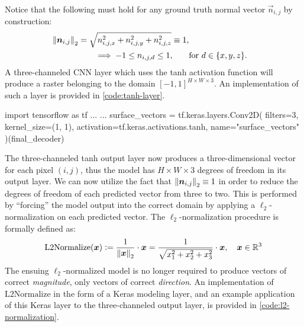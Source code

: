 Notice that the following must hold for any ground truth normal vector $\vec{n}_{i,j}$ by construction:
\begin{align*}
  \left\lVert\boldsymbol{n}_{i,j}\right\rVert_2 = \sqrt{n_{i,j,x}^2 + n_{i,j,y}^2 + n_{i,j,z}^2} \equiv 1, \\
  \implies -1 \leq n_{i,j,d} \leq 1, \qquad &\text{for } d \in \{x, y, z\}.
\end{align*}
%
A three-channeled CNN layer which uses the tanh activation function will produce a raster belonging to the domain $\left[-1, 1\right]^{H \times W \times 3}$.
An implementation of such a layer is provided in \cref{code:tanh-layer}.
\begin{listing}[H]
  \label{code:tanh-layer}
  \begin{pythoncode}
  import tensorflow as tf
  ...
  ...
  surface_vectors = tf.keras.layers.Conv2D(
      filters=3,
      kernel_size=(1, 1),
      activation=tf.keras.activations.tanh,
      name="surface_vectors"
  )(final_decoder)
  \end{pythoncode}
\end{listing}
\noindent
The three-channeled tanh output layer now produces a three-dimensional vector for each pixel $(i,j)$, thus the model has $H \times W \times 3$ degrees of freedom in its output layer.
We can now utilize the fact that $\left\lVert\boldsymbol{n}_{i,j}\right\rVert_2 \equiv 1$ in order to reduce the degrees of freedom of each predicted vector from three to two.
This is performed by \enquote{forcing} the model output into the correct domain by applying a $\ell_2$-normalization on each predicted vector.
The $\ell_2$-normalization procedure is formally defined as:
%
\begin{equation*}
  \mathrm{L2Normalize}(\boldsymbol{x})
  \vcentcolon=
  \frac{1}{\left\lVert\boldsymbol{x}\right\rVert_2} \cdot \boldsymbol{x}
  =
  \frac{1}{\sqrt{x_1^2 + x_2^2 + x_3^2}} \cdot \boldsymbol{x}
  ,\quad \boldsymbol{x} \in \mathbb{R}^3
\end{equation*}
%
The ensuing $\ell_2$-normalized model is no longer required to produce vectors of correct \emph{magnitude}, only vectors of correct \emph{direction}.
An implementation of $\mathrm{L2Normalize}$ in the form of a Keras modeling layer, and an example application of this Keras layer to the three-channeled output layer, is provided in \cref{code:l2-normalization}.
